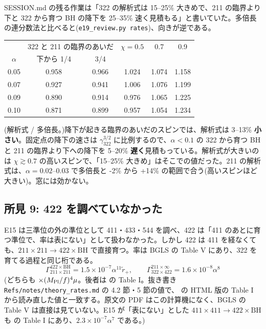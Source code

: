 SESSION.md の残る作業は「322 の解析式は 15--25\% 大きめで、211 の臨界より下と 322 から育つ BH の降下を 25--35\% 速く見積もる」と書いていた。多倍長の連分数法と比べると(\texttt{e19\_review.py rates})、向きが逆である。
\begin{center}\small
\begin{tabular}{cccccc}
\toprule
 & \multicolumn{2}{c}{322 と 211 の臨界のあいだ} & $\chi=0.5$ & 0.7 & 0.9\\
$\alpha$ & 下から 1/4 & 3/4 &  &  & \\
\midrule
0.05 & 0.958 & 0.966 & 1.024 & 1.074 & 1.158\\
0.07 & 0.927 & 0.941 & 1.006 & 1.076 & 1.199\\
0.09 & 0.890 & 0.914 & 0.976 & 1.065 & 1.225\\
0.10 & 0.871 & 0.899 & 0.957 & 1.054 & 1.234\\
\bottomrule
\end{tabular}
\end{center}
(解析式 / 多倍長。)降下が起きる臨界のあいだのスピンでは、解析式は 3--13\% \textbf{小さい}。固定点の降下の速さは $\gamma_{322}^{3/2}$ に比例するので、$\alpha<0.1$ の 322 から育つ BH と 211 の臨界より下への降下を 5--20\% \textbf{遅く}見積もっている。解析式が大きいのは $\chi\gtrsim0.7$ の高いスピンで、「15--25\% 大きめ」はそこでの値だった。211 の解析式は、$\alpha=0.02$--0.03 で多倍長と -2\% から +14\% の範囲で合う(高いスピンほど大きい)。窓には効かない。

\subsection{所見 9: 422 を調べていなかった}

E15 は三準位の外の準位として 411・433・544 を調べ、422 は「411 のあとに育つ準位で、率は表にない」として扱わなかった。しかし 422 は 411 を経なくても、$211\times211\to422\times\mathrm{BH}$ で直接育つ。率は BGLS の Table V にあり、322 を育てる過程と同じ桁である。
\begin{equation}
\Gamma^{422\times\mathrm{BH}}_{211\times211}=1.5\times10^{-7}\alpha^{11}\tilde r_+,\qquad
\Gamma^{211\times\infty}_{322\times422}=1.6\times10^{-8}\alpha^{8}
\end{equation}
(どちらも $\times(M_\mathrm{Pl}/f)^4\mu$。後者は  の Table I。抜き書き \texttt{Refs/notes/theory\_rates.md} の 4.2 節・5 節の値で、 の HTML 版の Table I から読み直した値と一致する。原文の PDF はこの計算機になく、BGLS の Table V は直接は見ていない。E15 が「表にない」とした $411\times411\to422\times\mathrm{BH}$ も  の Table I にあり、$2.3\times10^{-7}\alpha^7$ である。)

